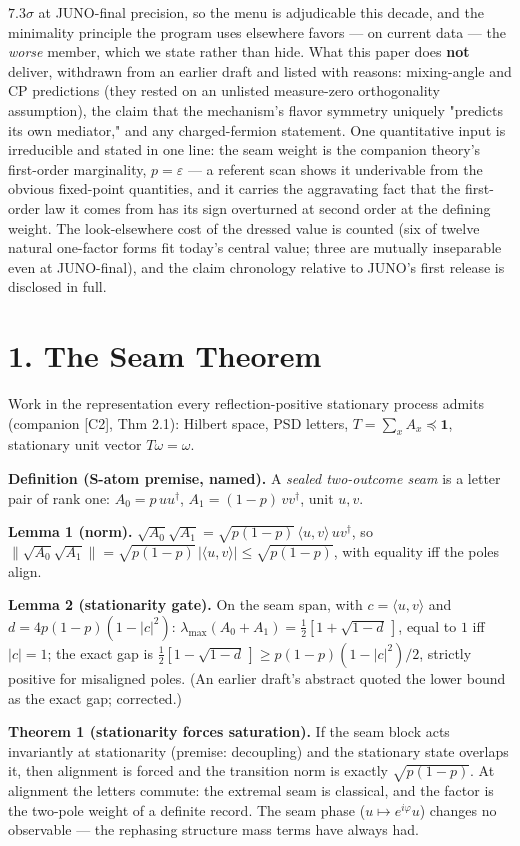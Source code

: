 \documentclass[11pt]{article}
\begin{document}
$7.3\sigma$ at JUNO-final precision, so the menu is adjudicable this decade, and the minimality principle the program uses elsewhere favors — on current data — the \emph{worse} member, which we state rather than hide.  What this paper does \textbf{not} deliver, withdrawn from an earlier draft and listed with reasons: mixing-angle and CP predictions (they rested on an unlisted measure-zero orthogonality assumption), the claim that the mechanism's flavor symmetry uniquely "predicts its own mediator," and any charged-fermion statement.  One quantitative input is irreducible and stated in one line: the seam weight is the companion theory's first-order marginality, $p = \varepsilon$ — a referent scan shows it underivable from the obvious fixed-point quantities, and it carries the aggravating fact that the first-order law it comes from has its sign overturned at second order at the defining weight.  The look-elsewhere cost of the dressed value is counted (six of twelve natural one-factor forms fit today's central value; three are mutually inseparable even at JUNO-final), and the claim chronology relative to JUNO's first release is disclosed in full.

\section*{1. The Seam Theorem}
Work in the representation every reflection-positive stationary process admits (companion [C2], Thm 2.1): Hilbert space, PSD letters, $T = \sum_x A_x \preceq \mathbf 1$, stationary unit vector $T\omega = \omega$.

\textbf{Definition (S-atom premise, named).}  A \emph{sealed two-outcome seam} is a letter pair of rank one: $A_0 = p\,uu^\dagger$, $A_1 = (1-p)\,vv^\dagger$, unit $u, v$.

\textbf{Lemma 1 (norm).}  $\sqrt{A_0}\sqrt{A_1} = \sqrt{p(1-p)}\, \langle u,v\rangle\,uv^\dagger$, so $\lVert\sqrt{A_0}\sqrt{A_1} \rVert = \sqrt{p(1-p)}\,|\langle u,v\rangle| \le \sqrt{p(1-p)}$, with equality iff the poles align.

\textbf{Lemma 2 (stationarity gate).}  On the seam span, with $c = \langle u,v\rangle$ and $d = 4p(1-p)(1-|c|^2)$: $\lambda_{\max}(A_0+A_1) = \tfrac12[1 + \sqrt{1-d}\,]$, equal to $1$ iff $|c| = 1$; the exact gap is $\tfrac12[1 - \sqrt{1-d}\,] \ge p(1-p)(1-|c|^2)/2$, strictly positive for misaligned poles. (An earlier draft's abstract quoted the lower bound as the exact gap; corrected.)

\textbf{Theorem 1 (stationarity forces saturation).}  If the seam block acts invariantly at stationarity (premise: decoupling) and the stationary state overlaps it, then alignment is forced and the transition norm is exactly $\sqrt{p(1-p)}$.  At alignment the letters commute: the extremal seam is classical, and the factor is the two-pole weight of a definite record.  The seam phase ($u \mapsto e^{i\varphi}u$) changes no observable — the rephasing structure mass terms have always had.
\end{document}
